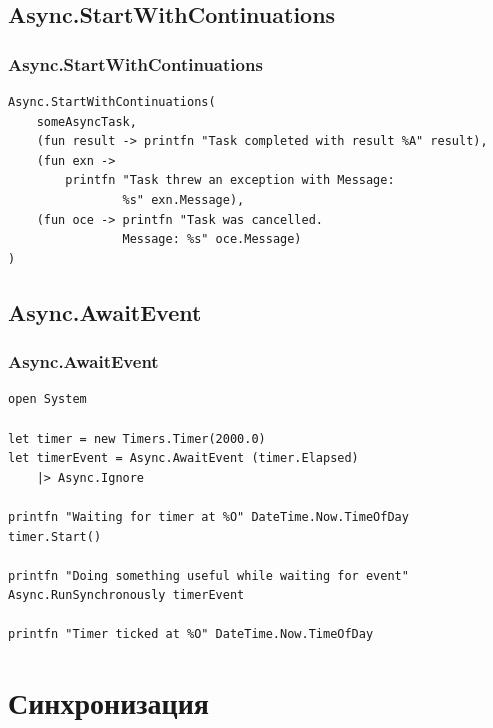 \documentclass[xetex,mathserif,serif]{beamer}
\begin{document}
	\subsection{Async.StartWithContinuations}

	\begin{frame}[fragile]
		\frametitle{Async.StartWithContinuations}
		\begin{verbatim}
Async.StartWithContinuations(
    someAsyncTask,
    (fun result -> printfn "Task completed with result %A" result),
    (fun exn -> 
        printfn "Task threw an exception with Message: 
                %s" exn.Message),
    (fun oce -> printfn "Task was cancelled. 
                Message: %s" oce.Message)
)
		\end{verbatim}
	\end{frame}

	\subsection{Async.AwaitEvent}

	\begin{frame}[fragile]
		\frametitle{Async.AwaitEvent}
		\begin{verbatim}
open System

let timer = new Timers.Timer(2000.0)
let timerEvent = Async.AwaitEvent (timer.Elapsed) 
    |> Async.Ignore

printfn "Waiting for timer at %O" DateTime.Now.TimeOfDay
timer.Start()

printfn "Doing something useful while waiting for event"
Async.RunSynchronously timerEvent

printfn "Timer ticked at %O" DateTime.Now.TimeOfDay
		\end{verbatim}
	\end{frame}

	\section{Синхронизация}
\end{document}
